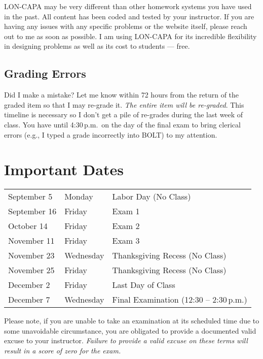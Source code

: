\documentclass[11pt,letterpaper]{article}
\begin{document}
LON-CAPA may be very different than other homework systems you have used in the
past. All content has been coded and tested by your instructor. If you are
having any issues with any specific problems or the website itself, please reach
out to me as soon as possible. I am using LON-CAPA for its incredible
flexibility in designing problems as well as its cost to students --- free.

\subsection{Grading Errors}
Did I make a mistake? Let me know within 72 hours from the return of the graded
item so that I may re-grade it. \emph{The entire item will be re-graded}. This
timeline is necessary so I don't get a pile of re-grades during the last week of
class. You have until 4:30\,p.m.\ on the day of the final exam to bring clerical
errors (e.g., I typed a grade incorrectly into BOLT) to my attention.

\section{Important Dates}\label{importantdates}
\begin{center}
	\begin{tabular} {l l l}
		September 5  & Monday     & Labor Day (No Class) \\
		September 16 & Friday     & Exam 1 \\
		October 14   & Friday     & Exam 2 \\
		November 11  & Friday     & Exam 3 \\
		November 23  & Wednesday  & Thanksgiving Recess (No Class) \\
		November 25  & Friday     & Thanksgiving Recess (No Class) \\
		December 2   & Friday     & Last Day of Class \\
		December 7   & Wednesday  & Final Examination (12:30 --
		2:30\,p.m.)
	\end{tabular}
\end{center}

Please note, if you are unable to take an examination at
its scheduled time due to some unavoidable circumstance, you are obligated to
provide a documented valid excuse to your instructor. \emph{Failure to provide a
valid excuse on these terms will result in a score of zero for the 
exam.}
\end{document}
